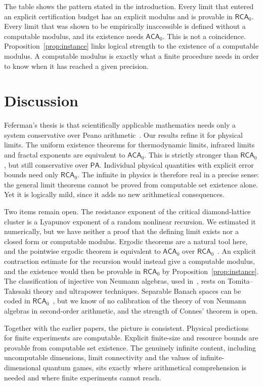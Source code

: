 \documentclass[11pt]{article}
\theoremstyle{definition}\newtheorem{definition}{Definition}[section]
\theoremstyle{remark}\newtheorem*{remark}{Remark}
\newcommand{\RCA}{\mathsf{RCA}_0}
\newcommand{\ACA}{\mathsf{ACA}_0}
\newcommand{\PA}{\mathsf{PA}}
\begin{document}
The table shows the pattern stated in the introduction. Every limit that entered an explicit certification budget has
an explicit modulus and is provable in $\RCA$. Every limit that was shown to be empirically inaccessible is defined
without a computable modulus, and its existence needs $\ACA$. This is not a coincidence. Proposition~\ref{prop:instance}
links logical strength to the existence of a computable modulus. A computable modulus is exactly what a finite procedure
needs in order to know when it has reached a given precision.

\section{Discussion}
\label{sec:discussion}

Feferman's thesis is that scientifically applicable mathematics needs only a system conservative over Peano
arithmetic~\cite{Feferman}. Our results refine it for physical limits. The uniform existence theorems for thermodynamic
limits, infrared limits and fractal exponents are equivalent to $\ACA$. This is strictly stronger than $\RCA$, but still
conservative over $\PA$. Individual physical quantities with explicit error bounds need only $\RCA$. The infinite in
physics is therefore real in a precise sense: the general limit theorems cannot be proved from computable set existence
alone. Yet it is logically mild, since it adds no new arithmetical consequences.

Two items remain open. The resistance exponent of the critical diamond-lattice cluster is a Lyapunov exponent of a
random nonlinear recursion. We estimated it numerically, but we have neither a proof that the defining limit exists nor
a closed form or computable modulus. Ergodic theorems are a natural tool here, and the pointwise ergodic theorem is
equivalent to $\ACA$ over $\RCA$~\cite{Simic}. An explicit contraction estimate for the recursion would instead give a computable
modulus, and the existence would then be provable in $\RCA$ by Proposition~\ref{prop:instance}. The classification of
injective von Neumann algebras, used in~\cite{Chen2026_qft}, rests on Tomita--Takesaki theory and ultrapower techniques.
Separable Banach spaces can be coded in $\RCA$~\cite{Simpson}, but we know of no calibration of the theory of von Neumann
algebras in second-order arithmetic, and the strength of Connes' theorem is open.

Together with the earlier papers, the picture is consistent. Physical predictions for finite experiments are computable.
Explicit finite-size and resource bounds are provable from computable set existence. The genuinely infinite content,
including uncomputable dimensions, limit connectivity and the values of infinite-dimensional quantum games, sits exactly
where arithmetical comprehension is needed and where finite experiments cannot reach.
\end{document}
